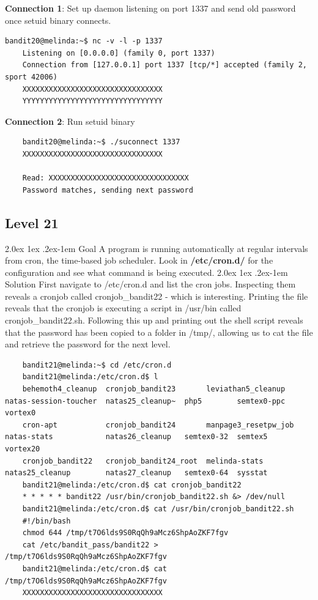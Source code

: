 \documentclass[11pt]{article}
\makeatletter
\renewcommand{\paragraph}{%
  \@startsection{paragraph}{4}%
  {\z@}{2.0ex \@plus 1ex \@minus .2ex}{-1em}%
  {\normalfont\normalsize\bfseries}%
}
\makeatother
\begin{document}
\textbf{Connection 1}: Set up daemon listening on port 1337 and send old password once setuid binary connects.
\begin{lstlisting}
bandit20@melinda:~$ nc -v -l -p 1337
	Listening on [0.0.0.0] (family 0, port 1337)
	Connection from [127.0.0.1] port 1337 [tcp/*] accepted (family 2, sport 42006)
	XXXXXXXXXXXXXXXXXXXXXXXXXXXXXXXX
	YYYYYYYYYYYYYYYYYYYYYYYYYYYYYYYY
\end{lstlisting}

\textbf{Connection 2}: Run setuid binary 
\begin{lstlisting}
	bandit20@melinda:~$ ./suconnect 1337
	XXXXXXXXXXXXXXXXXXXXXXXXXXXXXXXX

	Read: XXXXXXXXXXXXXXXXXXXXXXXXXXXXXXXX
	Password matches, sending next password
\end{lstlisting}
\newpage

\subsection{Level 21}
\paragraph{Goal}
A program is running automatically at regular intervals from cron, the time-based job scheduler. Look in \textbf{/etc/cron.d/} for the configuration and see what command is being executed.
\paragraph{Solution}
First navigate to /etc/cron.d and list the cron jobs. Inspecting them reveals a cronjob called cronjob\_bandit22 - which is interesting. Printing the file reveals that the cronjob is executing a script in /usr/bin called cronjob\_bandit22.sh. Following this up and printing out the shell script reveals that the password has been copied to a folder in /tmp/, allowing us to cat the file and retrieve the password for the next level.
\begin{lstlisting}
	bandit21@melinda:~$ cd /etc/cron.d
	bandit21@melinda:/etc/cron.d$ l
	behemoth4_cleanup  cronjob_bandit23       leviathan5_cleanup    natas-session-toucher  natas25_cleanup~  php5        semtex0-ppc  vortex0
	cron-apt           cronjob_bandit24       manpage3_resetpw_job  natas-stats            natas26_cleanup   semtex0-32  semtex5      vortex20
	cronjob_bandit22   cronjob_bandit24_root  melinda-stats         natas25_cleanup        natas27_cleanup   semtex0-64  sysstat
	bandit21@melinda:/etc/cron.d$ cat cronjob_bandit22
	* * * * * bandit22 /usr/bin/cronjob_bandit22.sh &> /dev/null
	bandit21@melinda:/etc/cron.d$ cat /usr/bin/cronjob_bandit22.sh
	#!/bin/bash
	chmod 644 /tmp/t7O6lds9S0RqQh9aMcz6ShpAoZKF7fgv
	cat /etc/bandit_pass/bandit22 > /tmp/t7O6lds9S0RqQh9aMcz6ShpAoZKF7fgv
	bandit21@melinda:/etc/cron.d$ cat /tmp/t7O6lds9S0RqQh9aMcz6ShpAoZKF7fgv
	XXXXXXXXXXXXXXXXXXXXXXXXXXXXXXXX

\end{lstlisting}
\end{document}

